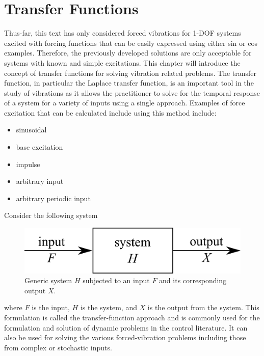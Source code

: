 \documentclass[12pt,letter]{article}
\begin{document}
	
	\setcounter{section}{2}	
	\setcounter{figure}{0}    
	\renewcommand\thefigure{\thesection.\arabic{figure}}


	\section{Transfer Functions}

		Thus-far, this text has only considered forced vibrations for 1-DOF systems excited with forcing functions that can be easily expressed using either sin or cos examples. Therefore, the previously developed solutions are only acceptable for systems with known and simple excitations. This chapter will introduce the concept of transfer functions for solving vibration related problems. The transfer function, in particular the Laplace transfer function, is an important tool in the study of vibrations as it allows the practitioner to solve for the temporal response of a system for a variety of inputs using a single approach. Examples of force excitation that can be calculated include using this method include:
		\begin{itemize}
			\item sinusoidal
			\item base excitation
			\item impulse
			\item arbitrary input
			\item arbitrary periodic input
		\end{itemize}

			Consider the following system

			\begin{figure}[H]
				\centering
				\includegraphics[]{../figures/control_system.png}
				\caption{Generic system $H$ subjected to an input $F$ and its corresponding output $X$.}
				\label{fig:control_system}
			\end{figure}

			\noindent where $F$ is the input, $H$ is the system, and $X$ is the output from the system. This formulation is called the transfer-function approach and is commonly used for the formulation and solution of dynamic problems in the control literature. It can also be used for solving the various forced-vibration problems including those from complex or stochastic inputs. 
\end{document}
